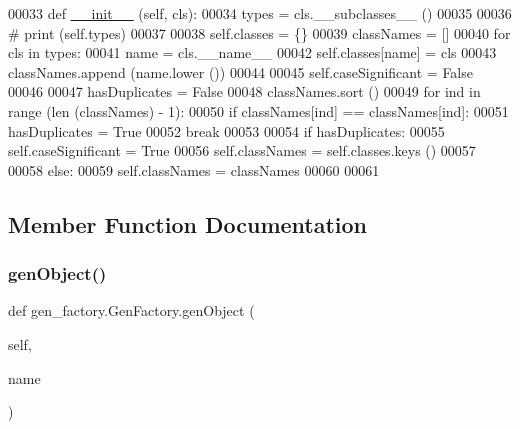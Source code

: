 \begin{DoxyCode}
00033     \textcolor{keyword}{def }\hyperlink{namespacestart__time_a9c9bd378729a13c96a22c8b079ea172c}{\_\_init\_\_} (self, cls):
00034         types = cls.\_\_subclasses\_\_ ()
00035         
00036 \textcolor{comment}{#        print (self.types)}
00037         
00038         self.classes = \{\}
00039         classNames = []
00040         \textcolor{keywordflow}{for} cls \textcolor{keywordflow}{in} types:
00041             name = cls.\_\_name\_\_
00042             self.classes[name] = cls
00043             classNames.append (name.lower ())
00044             
00045         self.caseSignificant = \textcolor{keyword}{False}
00046         
00047         hasDuplicates = \textcolor{keyword}{False}
00048         classNames.sort ()
00049         \textcolor{keywordflow}{for} ind \textcolor{keywordflow}{in} range (len (classNames) - 1):
00050             \textcolor{keywordflow}{if} classNames[ind] == classNames[ind]:
00051                 hasDuplicates = \textcolor{keyword}{True}
00052                 \textcolor{keywordflow}{break}
00053         
00054         \textcolor{keywordflow}{if} hasDuplicates:
00055             self.caseSignificant = \textcolor{keyword}{True}
00056             self.classNames = self.classes.keys ()
00057             
00058         \textcolor{keywordflow}{else}:
00059             self.classNames = classNames
00060             
00061             
\end{DoxyCode}


\subsection{Member Function Documentation}
\mbox{\label{classgen__factory_1_1_gen_factory_aeb00856af2fa15d7973be43678779561}} 
\subsubsection{\texorpdfstring{gen\+Object()}{genObject()}}
{\footnotesize\ttfamily def gen\+\_\+factory.\+Gen\+Factory.\+gen\+Object (\begin{DoxyParamCaption}\item[{}]{self,  }\item[{}]{name }\end{DoxyParamCaption})}



